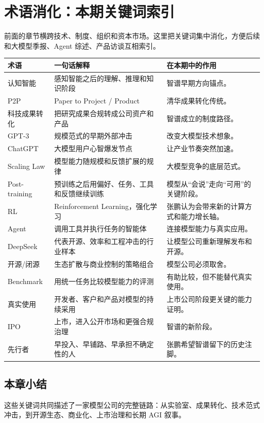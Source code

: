 \section{术语消化：本期关键词索引}

前面的章节横跨技术、制度、组织和资本市场。这里把关键词集中消化，方便后续和大模型季报、Agent 综述、产品访谈互相索引。

\begin{longtable}{p{}p{}p{}}
\toprule
术语 & 一句话解释 & 在本期中的作用 \\
\midrule
认知智能 & 感知智能之后的理解、推理和知识阶段 & 智谱早期方向锚点。 \\
P2P & Paper to Project / Product & 清华成果转化传统。 \\
科技成果转化 & 把研究成果合规转成公司资产和产品 & 智谱成立的制度路径。 \\
GPT-3 & 规模范式的早期外部冲击 & 改变大模型技术想象。 \\
ChatGPT & 大模型用户心智爆发节点 & 让产业节奏突然加速。 \\
Scaling Law & 模型能力随规模和反馈扩展的规律 & 大模型竞争的底层范式。 \\
Post-training & 预训练之后用偏好、任务、工具和反馈继续训练 & 模型从“会说”走向“可用”的关键阶段。 \\
RL & Reinforcement Learning，强化学习 & 张鹏认为会带来新的计算方式和能力增长轴。 \\
Agent & 调用工具并执行任务的智能体 & 连接模型能力与真实应用。 \\
DeepSeek & 代表开源、效率和工程冲击的行业样本 & 让模型公司重新理解发布和开源。 \\
开源/闭源 & 生态扩散与商业控制的策略组合 & 模型公司必须取舍。 \\
Benchmark & 用统一任务比较模型能力的评测 & 有助比较，但不能替代真实使用。 \\
真实使用 & 开发者、客户和产品对模型的持续采用 & 上市公司阶段更关键的能力证明。 \\
IPO & 上市，进入公开市场和更强合规治理 & 智谱的新阶段。 \\
先行者 & 早投入、早铺路、早承担不确定性的人 & 张鹏希望智谱留下的历史注脚。 \\
\bottomrule
\end{longtable}

\subsection{本章小结}

这些关键词共同描述了一家模型公司的完整链路：从实验室、成果转化、技术范式冲击，到开源生态、商业化、上市治理和长期 AGI 叙事。


